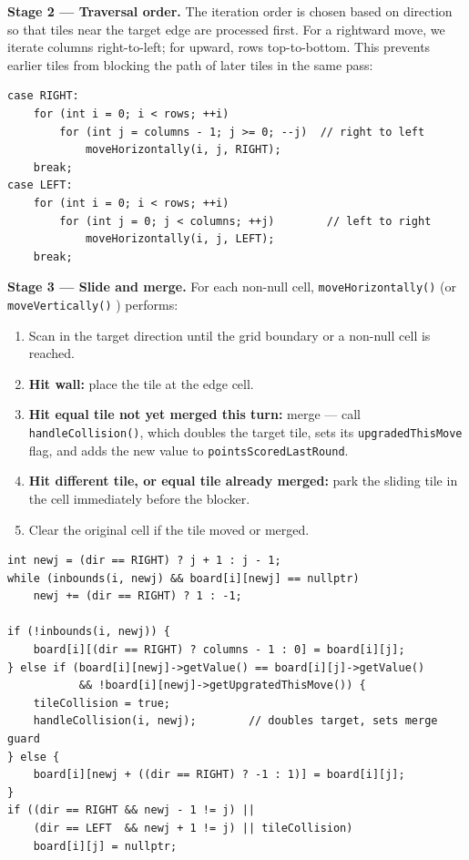 \documentclass[a4paper,12pt]{article}
\begin{document}
\textbf{Stage 2 --- Traversal order.} The iteration order is chosen based on direction so that tiles near the target edge are processed first. For a rightward move, we iterate columns right-to-left; for upward, rows top-to-bottom. This prevents earlier tiles from blocking the path of later tiles in the same pass:

\begin{lstlisting}[style=CppStyle, caption={Traversal order selection in \texttt{Board::move()}}]
case RIGHT:
    for (int i = 0; i < rows; ++i)
        for (int j = columns - 1; j >= 0; --j)  // right to left
            moveHorizontally(i, j, RIGHT);
    break;
case LEFT:
    for (int i = 0; i < rows; ++i)
        for (int j = 0; j < columns; ++j)        // left to right
            moveHorizontally(i, j, LEFT);
    break;
\end{lstlisting}

\textbf{Stage 3 --- Slide and merge.} For each non-null cell, \texttt{moveHorizontally()} (or \texttt{moveVertically()} ) performs:

\begin{enumerate}
    \item Scan in the target direction until the grid boundary or a non-null cell is reached.
    \item \textbf{Hit wall:} place the tile at the edge cell.
    \item \textbf{Hit equal tile not yet merged this turn:} merge --- call \texttt{handleCollision()}, which doubles the target tile, sets its \texttt{upgradedThisMove} flag, and adds the new value to \texttt{pointsScoredLastRound}.
    \item \textbf{Hit different tile, or equal tile already merged:} park the sliding tile in the cell immediately before the blocker.
    \item Clear the original cell if the tile moved or merged.
\end{enumerate}

\begin{lstlisting}[style=CppStyle, caption={Core of \texttt{moveHorizontally()} showing slide, merge, and park}]
int newj = (dir == RIGHT) ? j + 1 : j - 1;
while (inbounds(i, newj) && board[i][newj] == nullptr)
    newj += (dir == RIGHT) ? 1 : -1;

if (!inbounds(i, newj)) {
    board[i][(dir == RIGHT) ? columns - 1 : 0] = board[i][j];
} else if (board[i][newj]->getValue() == board[i][j]->getValue()
           && !board[i][newj]->getUpgratedThisMove()) {
    tileCollision = true;
    handleCollision(i, newj);        // doubles target, sets merge guard
} else {
    board[i][newj + ((dir == RIGHT) ? -1 : 1)] = board[i][j];
}
if ((dir == RIGHT && newj - 1 != j) ||
    (dir == LEFT  && newj + 1 != j) || tileCollision)
    board[i][j] = nullptr;
\end{lstlisting}
\end{document}
